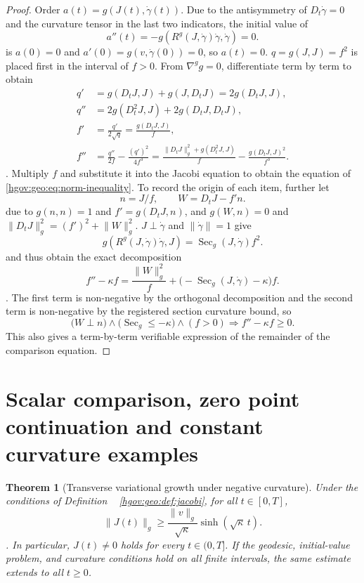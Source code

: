 \documentclass[12pt,a4paper,openany,notitlepage]{report}
\theoremstyle{plain}
\newtheorem{theorem}{Theorem}[chapter]
\theoremstyle{definition}
\theoremstyle{remark}
\begin{document}
\begin{CJK*}
\begin{proof}
Order $a(t)=g(J(t),\dot\gamma(t))$. Due to the antisymmetry of $D_t\dot\gamma=0$ and the curvature tensor in the last two indicators, the initial value of \[
a''(t)=-g(R^g(J,\dot\gamma)\dot\gamma,\dot\gamma)=0.
\] is $a(0)=0$ and $a'(0)=g(v,\dot\gamma(0))=0$, so $a(t)=0$. $q=g(J,J)=f^2$ is placed first in the interval of $f>0$. From $\nabla^g g=0$, differentiate term by term to obtain \[
\begin{aligned}
q'&=g(D_tJ,J)+g(J,D_tJ)=2g(D_tJ,J),\\
q''&=2g(D_t^2J,J)+2g(D_tJ,D_tJ),\\
f'&=\frac{q'}{2\sqrt q}=\frac{g(D_tJ,J)}{f},\\
f''&=\frac{q''}{2f}-\frac{(q')^2}{4f^3}
=\frac{\lVert D_tJ\rVert_g^2+g(D_t^2J,J)}{f}
-\frac{g(D_tJ,J)^2}{f^3}.
\end{aligned}
\]. Multiply $f$ and substitute it into the Jacobi equation to obtain the equation of ~ \eqref{hgov:geo:eq:norm-inequality}. To record the origin of each item, further let \[
n=J/f,\qquad W=D_tJ-f'n.
\] due to $g(n,n)=1$ and $f'=g(D_tJ,n)$, and $g(W,n)=0$ and $\lVert D_tJ\rVert_g^2=(f')^2+\lVert W\rVert_g^2$. $J\perp\dot\gamma$ and $\lVert\dot\gamma\rVert=1$ give \[
g(R^g(J,\dot\gamma)\dot\gamma,J)
=\operatorname{Sec}_g(J,\dot\gamma)f^2.
\] and thus obtain the exact decomposition \begin{equation}
\label{exp:geo:eq:norm-remainder}
f''-\kappa f
=\frac{\lVert W\rVert_g^2}{f}
+\bigl(-\operatorname{Sec}_g(J,\dot\gamma)-\kappa\bigr)f.
\end{equation}. The first term is non-negative by the orthogonal decomposition and the second term is non-negative by the registered section curvature bound, so \[
\bigl(W\perp n\bigr)\land
\bigl(\operatorname{Sec}_g\le-\kappa\bigr)\land(f>0)
\Longrightarrow f''-\kappa f\ge0.
\] This also gives a term-by-term verifiable expression of the remainder of the comparison equation.\end{proof}


\section { Scalar comparison, zero point continuation and constant curvature examples }\label{exp:geo:section:comparison}


\begin{theorem}
[Transverse variational growth under negative curvature]\label{hgov:geo:thm:growth}
Under the conditions of Definition ~ \ref{hgov:geo:def:jacobi}, for all $t\in[0,T]$,
\begin{equation}
\label{hgov:geo:eq:growth}
\lVert J(t)\rVert_g
\ge\frac{\lVert v\rVert_g}{\sqrt\kappa}
\sinh(\sqrt\kappa\,t).
\end{equation}.
In particular, $J(t)\ne0$ holds for every $t\in(0,T]$. If the geodesic, initial-value problem, and curvature conditions hold on all finite intervals, the same estimate extends to all $t\ge0$.\end{theorem}



\end{CJK*}
\end{document}
